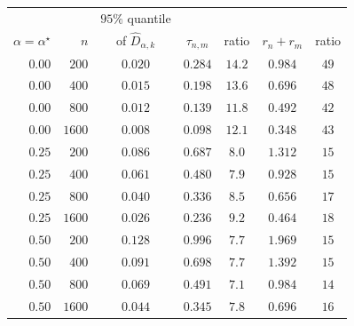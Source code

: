 \begin{tabular}{rrccccc}
\toprule
& & $95\%$ quantile & & & & \\
$\alpha=\alpha^\star$ & $n$ & of $\widehat D_{\alpha,k}$ & $\tau_{n,m}$ & ratio & $r_n+r_m$ & ratio \\
\midrule
$0.00$ & $200$ & $0.020$ & $0.284$ & $14.2$ & $0.984$ & $49$ \\
$0.00$ & $400$ & $0.015$ & $0.198$ & $13.6$ & $0.696$ & $48$ \\
$0.00$ & $800$ & $0.012$ & $0.139$ & $11.8$ & $0.492$ & $42$ \\
$0.00$ & $1600$ & $0.008$ & $0.098$ & $12.1$ & $0.348$ & $43$ \\
\addlinespace
$0.25$ & $200$ & $0.086$ & $0.687$ & $8.0$ & $1.312$ & $15$ \\
$0.25$ & $400$ & $0.061$ & $0.480$ & $7.9$ & $0.928$ & $15$ \\
$0.25$ & $800$ & $0.040$ & $0.336$ & $8.5$ & $0.656$ & $17$ \\
$0.25$ & $1600$ & $0.026$ & $0.236$ & $9.2$ & $0.464$ & $18$ \\
\addlinespace
$0.50$ & $200$ & $0.128$ & $0.996$ & $7.7$ & $1.969$ & $15$ \\
$0.50$ & $400$ & $0.091$ & $0.698$ & $7.7$ & $1.392$ & $15$ \\
$0.50$ & $800$ & $0.069$ & $0.491$ & $7.1$ & $0.984$ & $14$ \\
$0.50$ & $1600$ & $0.044$ & $0.345$ & $7.8$ & $0.696$ & $16$ \\
\bottomrule
\end{tabular}
